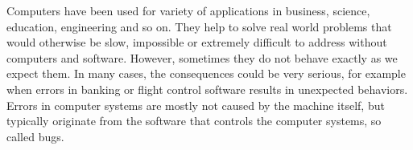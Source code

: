 \label{chapter:verification}

Computers have been used for variety of applications in business, science, education, engineering and so on. They help to solve real world problems that would otherwise be slow, impossible or extremely difficult to address without computers and software. However, sometimes they do not behave exactly as we expect them. %
In many cases, the consequences could be very serious, for example when errors
in banking or flight control software results in unexpected behaviors.
Errors in computer systems are mostly not caused by the machine itself, but typically originate from the software that controls the computer systems, so called bugs. 
%
